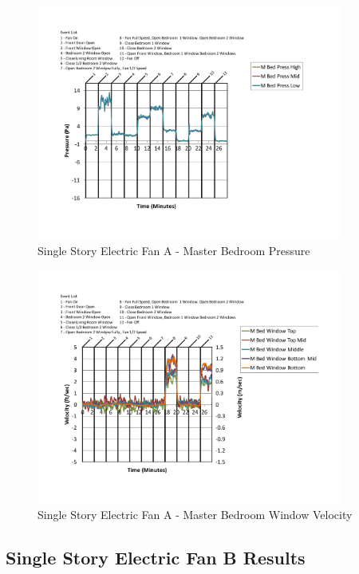 \documentclass{article}
\begin{document}
\begin{appendices}
	\begin{figure}[H]
		\centering
		\includegraphics[height=3.05in,trim=0.67in 1.1in 0.67in 0.8in,clip=true]{0_Images/Results_Charts/ColdFlow/Single_Story/Electric/A/Master_Bedroom_Pressure.pdf}
		\caption{Single Story Electric Fan A - Master Bedroom Pressure}
	\end{figure}
 

	\begin{figure}[H]
		\centering
		\includegraphics[height=3.05in,trim=0.67in 1.1in 0.67in 0.8in,clip=true]{0_Images/Results_Charts/ColdFlow/Single_Story/Electric/A/Master_Bedroom_Window_Velocity.pdf}
		\caption{Single Story Electric Fan A - Master Bedroom Window Velocity}
	\end{figure}
 
	\clearpage

		\clearpage
\clearpage		\large
\subsection{Single Story Electric Fan B Results} \label{App:Single_StoryElectricFanBResults} 


\end{appendices}
\end{document}
